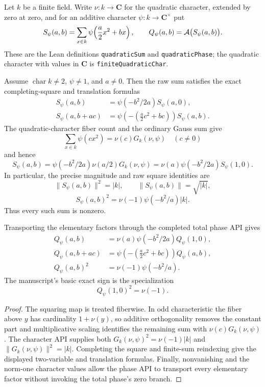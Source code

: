 \begin{definition}\label{mod:finitefield-quadraticphase}
Let $k$ be a finite field.  Write
$\nu:k\to\mathbf C$ for the quadratic character, extended by zero at
zero, and for an additive character $\psi:k\to\mathbf C^\times$ put
\[
 S_\psi(a,b)=\sum_{x\in k}
   \psi\!\left(\frac a2x^2+bx\right),
 \qquad
 Q_\psi(a,b)=\mathcal A\bigl(S_\psi(a,b)\bigr).
\]
These are the Lean definitions \texttt{quadraticSum} and
\texttt{quadraticPhase}; the quadratic character with values in
$\mathbf C$ is \texttt{finiteQuadraticChar}.

Assume $\operatorname{char}k\ne2$, $\psi\ne1$, and $a\ne0$.  Then the
raw sum satisfies the exact completing-square and translation formulas
\begin{align*}
 S_\psi(a,b)
  &=\psi(-b^2/2a)S_\psi(a,0),\\
 S_\psi(a,b+ac)
  &=\psi\!\left(-\left(\frac a2c^2+bc\right)\right)S_\psi(a,b).
\end{align*}
The quadratic-character fiber count and the ordinary Gauss sum give
\[
 \sum_{x\in k}\psi(cx^2)=\nu(c)G_k(\nu,\psi)
 \quad(c\ne0)
\]
and hence
\[
 S_\psi(a,b)
 =\psi(-b^2/2a)\nu(a/2)G_k(\nu,\psi)
 =\nu(a)\psi(-b^2/2a)S_\psi(1,0).
\]
In particular, the precise magnitude and raw square identities are
\[
 \lVert S_\psi(a,b)\rVert^2=|k|,
 \qquad
 \lVert S_\psi(a,b)\rVert=\sqrt{|k|},
\]
\[
 S_\psi(a,b)^2
 =\nu(-1)\psi(-b^2/a)|k|.
\]
Thus every such sum is nonzero.

Transporting the elementary factors through the completed total phase
API gives
\begin{align*}
 Q_\psi(a,b)
  &=\nu(a)\psi(-b^2/2a)Q_\psi(1,0),\\
 Q_\psi(a,b+ac)
  &=\psi\!\left(-\left(\frac a2c^2+bc\right)\right)Q_\psi(a,b),\\
 Q_\psi(a,b)^2
  &=\nu(-1)\psi(-b^2/a).
\end{align*}
The manuscript's basic exact sign is the specialization
\[
 Q_\psi(1,0)^2=\nu(-1).
\]
\leanok
{}
\FormalizationContract
\end{definition}
\begin{proof}
The squaring map is treated fiberwise.  In odd characteristic the fiber
above $y$ has cardinality $1+\nu(y)$, so additive orthogonality removes
the constant part and multiplicative scaling identifies the remaining
sum with $\nu(c)G_k(\nu,\psi)$.  The character API supplies both
$G_k(\nu,\psi)^2=\nu(-1)|k|$ and
$\lVert G_k(\nu,\psi)\rVert^2=|k|$.  Completing the square and finite-sum
reindexing give the displayed two-variable and translation formulas.
Finally, nonvanishing and the norm-one character values allow the phase
API to transport every elementary factor without invoking the total
phase's zero branch.
\end{proof}
